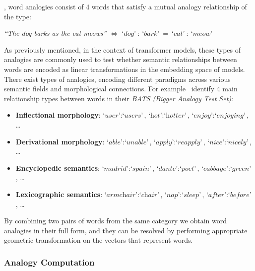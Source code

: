 , word analogies consist of $4$ words that satisfy a mutual analogy relationship of the type:
\begin{center}
    \emph{``The dog barks as the cat meows''} $\Longleftrightarrow$ $\textit{`dog'}\ :\ \textit{`bark'}\ =\ \textit{`cat'}\ :\ \textit{`meow'}$
\end{center}
As previously mentioned, in the context of transformer models, these types of analogies are commonly used to test whether semantic relationships between words are encoded as linear transformations in the embedding space of models.
There exist  types of analogies, encoding different paradigms across various semantic fields and morphological connections.
For example~\citet{drozd2016} identify $4$ main relationship types between words in their \emph{BATS (Bigger Analogy Test Set)}: 
\begin{itemize}
    \item \textbf{Inflectional morphology}: $\textit{`user'}\!:\!\textit{`users'}$, $\textit{`hot'}\!:\!\textit{`hotter'}$, $\textit{`enjoy'}\!:\!\textit{`enjoying'}$, \dots
    \item \textbf{Derivational morphology}: $\textit{`able'}\!:\!\textit{`unable'}$, $\textit{`apply'}\!:\!\textit{`reapply'}$, $\textit{`nice'}\!:\!\textit{`nicely'}$, \dots
    \item \textbf{Encyclopedic semantics}: $\textit{`madrid'}\!:\!\textit{`spain'}$, $\textit{`dante'}\!:\!\textit{`poet'}$, $\textit{`cabbage'}\!:\!\textit{`green'}$, \dots
    \item \textbf{Lexicographic semantics}: $\textit{`armchair'}\!:\!\textit{`chair'}$, $\textit{`nap'}\!:\!\textit{`sleep'}$, $\textit{`after'}\!:\!\textit{`before'}$, \dots
\end{itemize}
By combining two pairs of words from the same category we obtain word analogies in their full form, and they can be resolved by performing appropriate geometric transformation on the vectors that represent words.

\subsubsection{Analogy Computation}


